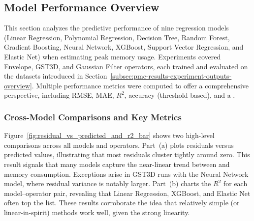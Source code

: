 \subsection{Model Performance Overview}
\label{subsec:pmc-results-model-performance-overview}

This section analyzes the predictive performance of nine regression models (Linear Regression, Polynomial Regression, Decision Tree, Random Forest, Gradient Boosting, Neural Network, XGBoost, Support Vector Regression, and Elastic Net) when estimating peak memory usage.
Experiments covered Envelope, \ac{GST3D}, and Gaussian Filter operators, each trained and evaluated on the datasets introduced in Section~\ref{subsec:pmc-results-experiment-outputs-overview}.
Multiple performance metrics were computed to offer a comprehensive perspective, including \ac{RMSE}, \ac{MAE}, $R^2$, accuracy (threshold-based), and a .

\subsubsection{Cross-Model Comparisons and Key Metrics}
\label{subsec:cross-model-comparisons-and-key-metrics}

Figure~\ref{fig:residual_vs_predicted_and_r2_bar} shows two high-level comparisons across all models and operators.
Part~(a) plots residuals versus predicted values, illustrating that most residuals cluster tightly around zero.
This result signals that many models capture the near-linear trend between  and memory consumption.
Exceptions arise in \ac{GST3D} runs with the Neural Network model, where residual variance is notably larger.
Part~(b) charts the $R^2$ for each model--operator pair, revealing that Linear Regression, XGBoost, and Elastic Net often top the list.
These results corroborate the idea that relatively simple (or linear-in-spirit) methods work well, given the strong  linearity.

